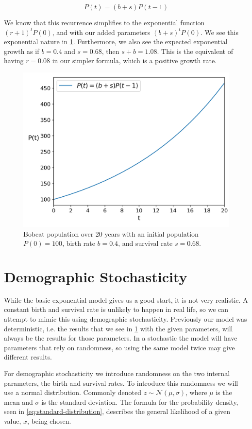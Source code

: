 \documentclass{article}
\begin{document}
\begin{equation} \label{eq:exponential}
    P(t) = (b+s)P(t-1)
\end{equation}

We know that this recurrence simplifies to the exponential function $(r + 1)^tP(0)$, and with our added parameters $(b + s)^tP(0)$. We see this exponential nature in \cref{fig:exponential}. Furthermore, we also see the expected exponential growth as if $b=0.4$ and $s=0.68$, then $s+b = 1.08$. This is the equivalent of having $r = 0.08$ in our simpler formula, which is a positive growth rate.

\begin{figure}
    \centering
    \includegraphics[width=.5\linewidth]{plots/exponential.png}
    \caption{Bobcat population over 20 years with an initial population $P(0)=100$, birth rate $b=0.4$, and survival rate $s=0.68$.}
    \label{fig:exponential}
\end{figure}

\section{Demographic Stochasticity}
While the basic exponential model gives us a good start, it is not very realistic. A constant birth and survival rate is unlikely to happen in real life, so we can attempt to mimic this using demographic stochasticity. Previously our model was deterministic, i.e. the results that we see in \cref{fig:exponential} with the given parameters, will always be the results for those parameters. In a stochastic the model will have parameters that rely on randomness, so using the same model twice may give different results.

For demographic stochasticity we introduce randomness on the two internal parameters, the birth and survival rates. To introduce this randomness we will use a normal distribution. Commonly denoted $z \sim \mathcal{N}(\mu, \sigma)$, where $\mu$ is the mean and $\sigma$ is the standard deviation. The formula for the probability density, seen in \cref{eq:standard-distribution}, describes the general likelihood of a given value, $x$, being chosen.
\end{document}
